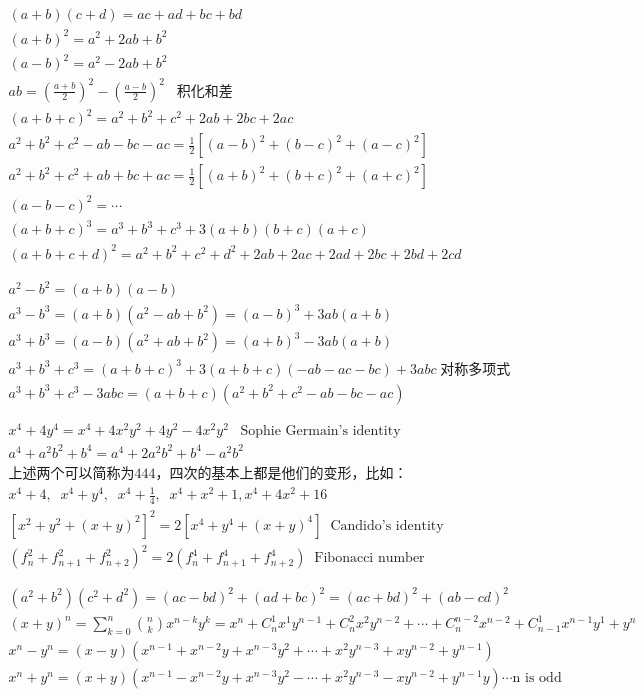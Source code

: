 \documentclass[../main.tex]{subfiles}
\begin{document}
\begin{gather*}
  (a+b)(c+d) = ac + ad + bc + bd\\
  (a+b)^2 = a^2+2ab+b^2\\
  (a-b)^2 = a^2-2ab+b^2\\
  ab = (\frac{a+b}{2})^2-(\frac{a-b}{2})^2\;\;\;\text{积化和差}\\
  (a+b+c)^2= a^2+b^2+c^2+2ab+2bc+2ac\\
  a^2+b^2+c^2-ab-bc-ac=\frac{1}{2}[(a-b)^2+(b-c)^2+(a-c)^2]\\
  a^2+b^2+c^2+ab+bc+ac=\frac{1}{2}[(a+b)^2+(b+c)^2+(a+c)^2]\\
  (a-b-c)^2=\cdots\\
  (a+b+c)^3=a^3+b^3+c^3+3(a+b)(b+c)(a+c)\\
  (a+b+c+d)^2=a^2+b^2+c^2+d^2+2ab+2ac+2ad+2bc+2bd+2cd\\
  \phantom{x}\\
  a^2-b^2=(a+b)(a-b)\\
  a^3-b^3=(a+b)(a^2-ab+b^2)=(a-b)^3+3ab(a+b)\\
  a^3+b^3=(a-b)(a^2+ab+b^2)=(a+b)^3-3ab(a+b)\\
  a^3+b^3+c^3=(a+b+c)^3+3(a+b+c)(-ab-ac-bc)+3abc \;\text{对称多项式}\\
  a^3+b^3+c^3-3abc=(a+b+c)(a^2+b^2+c^2-ab-bc-ac)\\
  \phantom{x}\\
  x^4+4y^4=x^4+4x^2y^2+4y^2-4x^2y^2  \;\;\;\text{Sophie Germain's identity}\\
  a^4+a^2b^2+b^4=a^4+2a^2b^2+b^4-a^2b^2\\
  \text{上述两个可以简称为444，四次的基本上都是他们的变形，比如：}\\
  x^4+4, \;\; x^4+y^4, \;\;x^4+\frac{1}{4}, \;\;x^4+x^2+1, x^4+4x^2+16\\
  [x^2+y^2+(x+y)^2]^2 = 2[x^4+y^4+(x+y)^4] \;\; \text{Candido's identity}\\
  (f_n^2+f_{n+1}^2+f_{n+2}^{2})^2=2(f_n^4+f_{n+1}^4+f_{n+2}^4) \;\;\text{Fibonacci number}\\
   \phantom{x}\\
  (a^2+b^2)(c^2+d^2)=(ac-bd)^2+(ad+bc)^2=(ac+bd)^2+(ab-cd)^2\\
  (x+y)^n= \sum_{k=0}^n\binom{n}{k}x^{n-k}y^k=x^n+C_n^1x^1y^{n-1}+C_n^2x^2y^{n-2}+\cdots + C_n^{n-2}x^{n-2}+C_{n-1}^1x^{n-1}y^1+y^n\\
  x^n-y^n=(x-y)(x^{n-1}+x^{n-2}y+x^{n-3}y^2+\cdots + x^2y^{n-3}+xy^{n-2}+y^{n-1})\\
  x^n+y^n=(x+y)(x^{n-1}-x^{n-2}y+x^{n-3}y^2-\cdots +x^2y^{n-3}-xy^{n-2}+y^{n-1}y) \cdots \text{n is odd}\\
\end{gather*}
\end{document}
